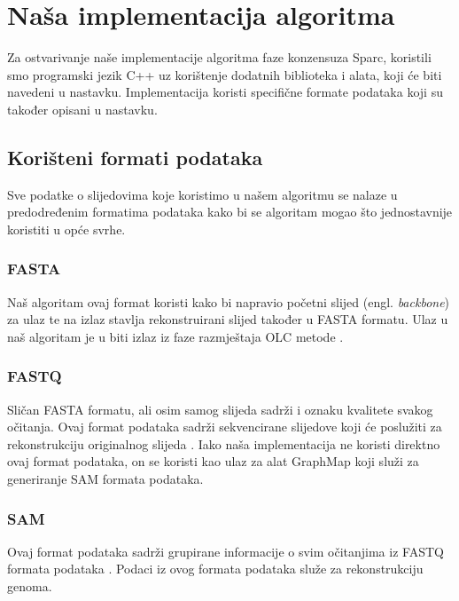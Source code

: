\documentclass[times, utf8, seminar, numeric]{fer}
\begin{document}

\chapter{Naša implementacija algoritma}
Za ostvarivanje naše implementacije algoritma faze konzensuza Sparc, koristili smo programski jezik C++ uz korištenje dodatnih biblioteka i alata, koji će biti navedeni u nastavku. Implementacija koristi specifične formate podataka koji su također opisani u nastavku.
\section{Korišteni formati podataka}
Sve podatke o slijedovima koje koristimo u našem algoritmu se nalaze u predodređenim formatima podataka kako bi se algoritam mogao što jednostavnije koristiti u opće svrhe. 
\subsection{FASTA}
Naš algoritam ovaj format koristi kako bi napravio početni slijed (engl. \emph{backbone}) za ulaz te na izlaz stavlja rekonstruirani slijed također u FASTA formatu.
Ulaz u naš algoritam je u biti izlaz iz faze razmještaja OLC metode \cite[Poglavlje~1.3.1]{sikic2013bioinformatika}.
\subsection{FASTQ}
Sličan FASTA formatu, ali osim samog slijeda sadrži i oznaku kvalitete svakog očitanja.
Ovaj format podataka sadrži sekvencirane slijedove koji će poslužiti za rekonstrukciju originalnog slijeda \cite[Poglavlje~1.3.2]{sikic2013bioinformatika} .
Iako naša implementacija ne koristi direktno ovaj format podataka, on se koristi kao ulaz za alat GraphMap koji služi za generiranje SAM formata podataka. 
\subsection{SAM}
Ovaj format podataka sadrži grupirane informacije o svim očitanjima iz FASTQ formata podataka \cite{sam_format}. Podaci iz ovog formata podataka služe za rekonstrukciju genoma. 
\end{document}
